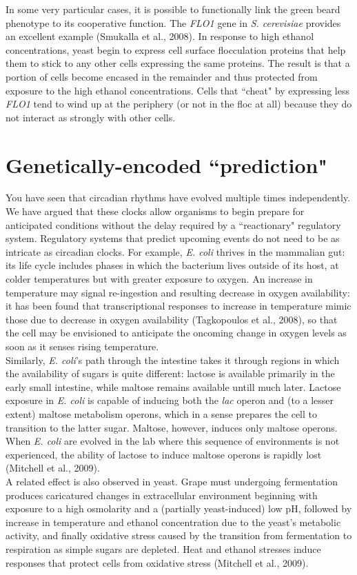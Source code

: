 \documentclass{article}
\begin{document}
In some very particular cases, it is possible to functionally link the green beard phenotype to its cooperative function. The \textit{FLO1} gene in \textit{S. cerevisiae} provides an excellent example (Smukalla et al., 2008). In response to high ethanol concentrations, yeast begin to express cell surface flocculation proteins that help them to stick to any other cells expressing the same proteins. The result is that a portion of cells become encased in the remainder and thus protected from exposure to the high ethanol concentrations. Cells that ``cheat" by expressing less \textit{FLO1} tend to wind up at the periphery (or not in the floc at all) because they do not interact as strongly with other cells.


\section*{Genetically-encoded ``prediction"}

You have seen that circadian rhythms have evolved multiple times independently. We have argued that these clocks allow organisms to begin prepare for anticipated conditions without the delay required by a ``reactionary" regulatory system. Regulatory systems that predict upcoming events do not need to be as intricate as circadian clocks. For example, \textit{E. coli} thrives in the mammalian gut: its life cycle includes phases in which the bacterium lives outside of its host, at colder temperatures but with greater exposure to oxygen. An increase in temperature may signal re-ingestion and resulting decrease in oxygen availability: it has been found that transcriptional responses to increase in temperature mimic those due to decrease in oxygen availability (Tagkopoulos et al., 2008), so that the cell may be envisioned to anticipate the oncoming change in oxygen levels as soon as it senses rising temperature.\\

Similarly, \textit{E. coli}'s path through the intestine takes it through regions in which the availability of sugars is quite different: lactose is available primarily in the early small intestine, while maltose remains available untill much later.  Lactose exposure in \textit{E. coli} is capable of inducing both the \textit{lac} operon and (to a lesser extent) maltose metabolism operons, which in a sense prepares the cell to transition to the latter sugar. Maltose, however, induces only maltose operons. When \textit{E. coli} are evolved in the lab where this sequence of environments is not experienced, the ability of lactose to induce maltose operons is rapidly lost (Mitchell et al., 2009).\\

A related effect is also observed in yeast. Grape must undergoing fermentation produces caricatured changes in extracellular environment beginning with exposure to a high osmolarity and a (partially yeast-induced) low pH, followed by increase in temperature and ethanol concentration due to the yeast's metabolic activity, and finally oxidative stress caused by the transition from fermentation to respiration as simple sugars are depleted. Heat and ethanol stresses induce responses that protect cells from oxidative stress (Mitchell et al., 2009).
\end{document}
